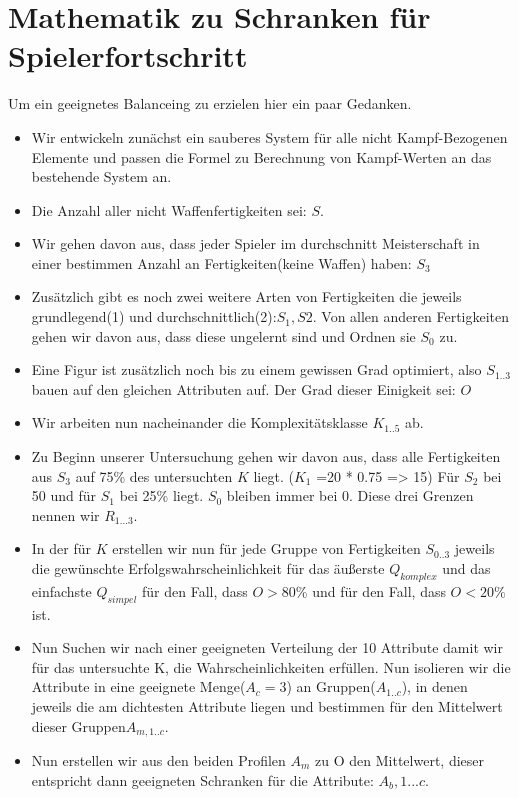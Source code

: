\documentclass[a4paper,12pt,oneside]{book}
\begin{document}
\section{Mathematik zu Schranken für Spielerfortschritt}
Um ein geeignetes Balanceing zu erzielen hier ein paar Gedanken.
\begin{itemize}
\item Wir entwickeln zunächst ein sauberes System für alle nicht Kampf-Bezogenen Elemente und passen die Formel zu Berechnung von Kampf-Werten an das bestehende System an.
\item Die Anzahl aller nicht Waffenfertigkeiten sei: $S$. 
\item Wir gehen davon aus, dass jeder Spieler im durchschnitt Meisterschaft in einer bestimmen Anzahl an Fertigkeiten(keine Waffen) haben: \(S_{3}\)
\item Zusätzlich gibt es noch zwei weitere Arten von Fertigkeiten die jeweils grundlegend(1) und durchschnittlich(2):$S_{1}, S{2}$. Von allen anderen Fertigkeiten gehen wir davon aus, dass diese ungelernt sind und Ordnen sie $S_{0}$ zu.
\item Eine Figur ist zusätzlich noch bis zu einem gewissen Grad optimiert, also $S_{1..3}$ bauen auf den gleichen Attributen auf. Der Grad dieser Einigkeit sei: $O$
\item Wir arbeiten nun nacheinander die Komplexitätsklasse $K_{1..5}$ ab.
\item Zu Beginn unserer Untersuchung gehen wir davon aus, dass alle Fertigkeiten aus $S_{3}$ auf 75\% des untersuchten $K$ liegt. ($K_{1}$ =20 * 0.75 => 15) Für $S_2$ bei 50 und für $S_1$ bei 25\% liegt. $S_{0}$ bleiben immer bei 0. Diese drei Grenzen nennen wir $R_{1...3}$.
\item In der für $K$ erstellen wir nun für jede Gruppe von Fertigkeiten $S_{0..3}$ jeweils die gewünschte Erfolgswahrscheinlichkeit für das äußerste $Q_{komplex}$ und das einfachste $Q_{simpel}$ für den Fall, dass $O>80\%$ und für den Fall, dass $O<20\%$ ist.
\item Nun Suchen wir nach einer geeigneten Verteilung der 10 Attribute damit wir für das untersuchte K, die Wahrscheinlichkeiten erfüllen. Nun isolieren wir die Attribute in eine geeignete Menge($A_{c}=3$) an Gruppen($A_{1..c}$), in denen jeweils die am dichtesten Attribute liegen und bestimmen für den Mittelwert dieser Gruppen$A_{m, 1..c}$.
\item Nun erstellen wir aus den beiden Profilen $A_{m}$ zu O den Mittelwert, dieser entspricht dann geeigneten Schranken für die Attribute: $A_b,1...c$.

\end{itemize}
\end{document}
